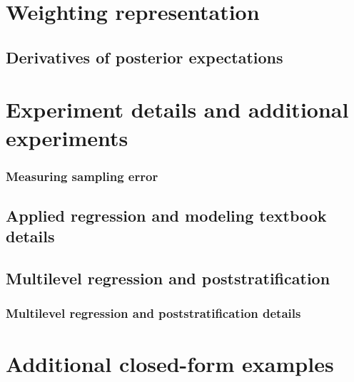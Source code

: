 \documentclass[12pt]{article} %
\begin{document}
\section{Weighting representation}



\subsection{Derivatives of posterior expectations}




\newpage
\section{Experiment details and additional experiments}

\subsubsection{Measuring sampling error}


\subsection{Applied regression and modeling textbook details}


\subsection{Multilevel regression and poststratification}


\subsubsection{Multilevel regression and poststratification details}





\newpage
\section{Additional closed-form examples}


\end{document}
